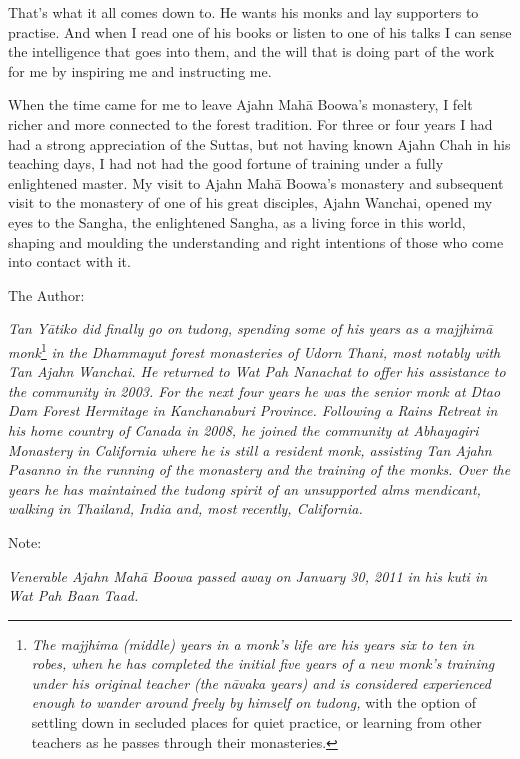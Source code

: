 That's what it all comes down to. He wants his monks and lay supporters
to practise. And when I read one of his books or listen to one of his
talks I can sense the intelligence that goes into them, and the will
that is doing part of the work for me by inspiring me and instructing
me.

When the time came for me to leave Ajahn Mahā Boowa's monastery, I felt
richer and more connected to the forest tradition. For three or four
years I had had a strong appreciation of the Suttas, but not having
known Ajahn Chah in his teaching days, I had not had the good fortune of
training under a fully enlightened master. My visit to Ajahn Mahā
Boowa's monastery and subsequent visit to the monastery of one of his
great disciples, Ajahn Wanchai, opened my eyes to the Sangha, the
enlightened Sangha, as a living force in this world, shaping and
moulding the understanding and right intentions of those who come into
contact with it.



The Author:

\emph{Tan Yātiko did finally go on tudong, spending some of his years as
a majjhimā monk}\footnote{\emph{The majjhima (middle) years in a monk's
  life are his years six to ten in robes, when he has completed the
  initial five years of a new monk's training under his original teacher
  (the nāvaka years) and is considered experienced enough to wander
  around freely by himself on tudong,} with the option of settling down
  in secluded places for quiet practice, or learning from other teachers
  as he passes through their monasteries.} \emph{in the Dhammayut forest
monasteries of Udorn Thani, most notably with Tan Ajahn Wanchai. He
returned to Wat Pah Nanachat to offer his assistance to the community in
2003. For the next four years he was the senior monk at Dtao Dam Forest
Hermitage in Kanchanaburi Province. Following a Rains Retreat in his
home country of Canada in 2008, he joined the community at Abhayagiri
Monastery in California where he is still a resident monk, assisting Tan
Ajahn Pasanno in the running of the monastery and the training of the
monks. Over the years he has maintained the tudong spirit of an
unsupported alms mendicant, walking in Thailand, India and, most
recently, California.}

Note:

\emph{Venerable Ajahn Mahā Boowa passed away on January 30, 2011 in his
kuti in Wat Pah Baan Taad.}

